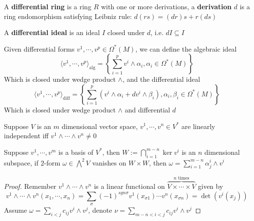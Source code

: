 \documentclass[../main.tex]{subfiles}
\begin{document}
\begin{definition}
A \textbf{differential ring} is a ring $R$ with one or more derivations, a \textbf{derivation} $d$ is a ring endomorphism satisfying Leibniz rule: $d(rs)=(dr)s+r(ds)$ \par
A \textbf{differential ideal} is an ideal $I$ closed under $d$, i.e. $dI\subseteq I$
\end{definition}

\begin{example}
Given differential forms $v^1,\cdots,v^p\in\Omega^*(M)$, we can define the algebraic ideal
\[\langle v^1,\cdots,v^p\rangle_{\mathrm{alg}}=\left\{\sum_{i=1}^pv^i\wedge\alpha_i,\alpha_i\in\Omega^*(M)\right\}\]
Which is closed under wedge product $\wedge$, and the differential ideal
\[\langle v^1,\cdots,v^p\rangle_{\mathrm{diff}}=\left\{\sum_{i=1}^p(v^i\wedge\alpha_i+dv^i\wedge\beta_i),\alpha_i,\beta_i\in\Omega^*(M)\right\}\]
Which is closed under wedge product $\wedge$ and differential $d$
\end{example}

\begin{lemma}\label{Lemma' for Frobenius theorem}
Suppose $V$ is an $m$ dimensional vector space, $v^1,\cdots,v^n\in V^*$ are linearly independent iff $v^1\wedge\cdots\wedge v^n\neq0$ \par
Suppose $v^1,\cdots,v^m$ is a basis of $V^*$, then $\displaystyle W:=\bigcap_{i=1}^{m-n}\ker v^i$ is an $n$ dimensional subspace, if $2$-form $\omega\in\bigwedge^2V$ vanishes on $W\times W$, then $\displaystyle\omega=\sum_{i=1}^{m-n}\alpha^i_j\wedge v^i$
\end{lemma}

\begin{proof}
Remember $v^1\wedge\cdots\wedge v^{n}$ is a linear functional on $\overbrace{V\times\cdots\times V}^{n\text{ times}}$ given by
\[v^1\wedge\cdots\wedge v^n(x_1,\cdots,x_n)=\sum_{\sigma}(-1)^{sgn\sigma}v^1(x_{\sigma1})\cdots v^n(x_{\sigma n})=\det(v^i(x_j))\]
Assume $\displaystyle\omega=\sum_{i<j}c_{ij}v^i\wedge v^j$, denote $\displaystyle\nu=\sum_{m-n<i<j}c_{ij}v^i\wedge v^j$
\end{proof}
\end{document}

